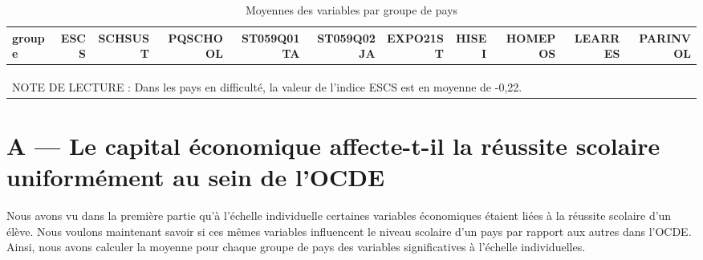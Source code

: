\documentclass[
  french,
  11pt,
  a4paper,
]{report}
\begin{document}
\begin{longtable}[t]{lrrrrrrrrrr}
\caption{\label{tab:unnamed-chunk-2}Moyennes des variables par groupe de pays}\\
\toprule
groupe & ESCS & SCHSUST & PQSCHOOL & ST059Q01TA & ST059Q02JA & EXPO21ST & HISEI & HOMEPOS & LEARRES & PARINVOL\\
\midrule
\cellcolor[HTML]{f8d7da}{En difficulté} & \cellcolor[HTML]{f8d7da}{-0.22} & \cellcolor[HTML]{f8d7da}{-0.07} & \cellcolor[HTML]{f8d7da}{0.21} & \cellcolor[HTML]{f8d7da}{4.97} & \cellcolor[HTML]{f8d7da}{27.82} & \cellcolor[HTML]{f8d7da}{0.03} & \cellcolor[HTML]{f8d7da}{50.80} & \cellcolor[HTML]{f8d7da}{-0.34} & \cellcolor[HTML]{f8d7da}{0.10} & \cellcolor[HTML]{f8d7da}{0.25}\\
\cellcolor[HTML]{fff3cd}{Résultats intermédiaires} & \cellcolor[HTML]{fff3cd}{0.05} & \cellcolor[HTML]{fff3cd}{0.12} & \cellcolor[HTML]{fff3cd}{-0.12} & \cellcolor[HTML]{fff3cd}{4.29} & \cellcolor[HTML]{fff3cd}{27.75} & \cellcolor[HTML]{fff3cd}{-0.03} & \cellcolor[HTML]{fff3cd}{53.02} & \cellcolor[HTML]{fff3cd}{0.12} & \cellcolor[HTML]{fff3cd}{0.08} & \cellcolor[HTML]{fff3cd}{0.05}\\
\cellcolor[HTML]{d4edda}{Meilleurs résultats} & \cellcolor[HTML]{d4edda}{0.19} & \cellcolor[HTML]{d4edda}{0.00} & \cellcolor[HTML]{d4edda}{-0.18} & \cellcolor[HTML]{d4edda}{4.35} & \cellcolor[HTML]{d4edda}{26.23} & \cellcolor[HTML]{d4edda}{0.02} & \cellcolor[HTML]{d4edda}{56.33} & \cellcolor[HTML]{d4edda}{0.24} & \cellcolor[HTML]{d4edda}{-0.15} & \cellcolor[HTML]{d4edda}{-0.27}\\
\bottomrule
\multicolumn{11}{l}{\rule{0pt}{1em}NOTE DE LECTURE : Dans les pays en difficulté, la valeur de l'indice ESCS est en moyenne de -0,22.}\\
\end{longtable}
\endgroup{}

\section{A --- Le capital économique affecte-t-il la réussite scolaire
uniformément au sein de
l'OCDE}\label{a-le-capital-uxe9conomique-affecte-t-il-la-ruxe9ussite-scolaire-uniformuxe9ment-au-sein-de-locde}

Nous avons vu dans la première partie qu'à l'échelle individuelle
certaines variables économiques étaient liées à la réussite scolaire
d'un élève. Nous voulons maintenant savoir si ces mêmes variables
influencent le niveau scolaire d'un pays par rapport aux autres dans
l'OCDE. Ainsi, nous avons calculer la moyenne pour chaque groupe de pays
des variables significatives à l'échelle individuelles.
\end{document}
